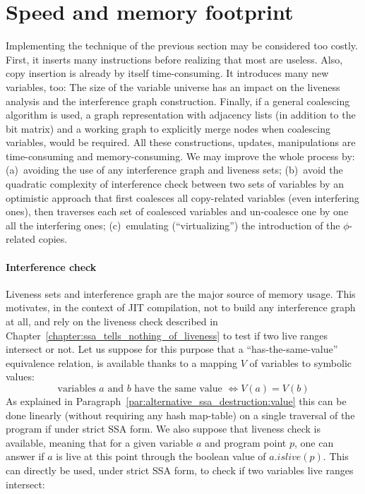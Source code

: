 \section{Speed and memory footprint}
Implementing the technique of the previous section may be considered too costly. 
First, it inserts many instructions before realizing that most are useless.
Also, copy insertion is already by itself time-consuming. 
It introduces many new variables, too: 
The size of the variable universe has an impact on the liveness analysis and the interference graph construction. 
Finally, if a general coalescing algorithm is used, a graph representation with adjacency lists (in addition to the bit matrix) and a working graph to explicitly merge nodes when coalescing variables, would be required. 
All these constructions, updates, manipulations are time-consuming and memory-consuming. 
We may improve the whole process by: 
(a)~avoiding the use of any interference graph and liveness sets; 
(b)~avoid the quadratic complexity of interference check between two sets of variables by an optimistic approach that first coalesces all copy-related variables (even interfering ones), then traverses each set of coalesced variables and un-coalesce one by one all the interfering ones; 
(c)~emulating (``virtualizing'') the introduction of the $\phi$-related copies.

\paragraph{Interference check}
Liveness sets and interference graph are the major source of memory usage. 
This motivates, in the context of JIT compilation, not to build any interference graph at all, and rely on the liveness check described in Chapter~\ref{chapter:ssa_tells_nothing_of_liveness} to test if two live ranges intersect or not. 
Let us suppose for this purpose that a ``has-the-same-value'' equivalence relation, is available thanks to a mapping $V$ of variables to symbolic values: 
\\
$$\textrm{variables }a\textrm{ and }b\textrm{ have the same value } \Leftrightarrow V(a)=V(b)$$
As explained in Paragraph~\ref{par:alternative_ssa_destruction:value} this can be done linearly (without requiring any hash map-table) on a single traversal of the program if under strict SSA form. 
We also suppose that liveness check is available, meaning that for a given variable $a$ and program point $p$, one can answer if $a$ is live at this point through the boolean value of  $a.\textit{islive}(p)$. This can directly be used, under strict SSA form, to check if two variables live ranges intersect:

